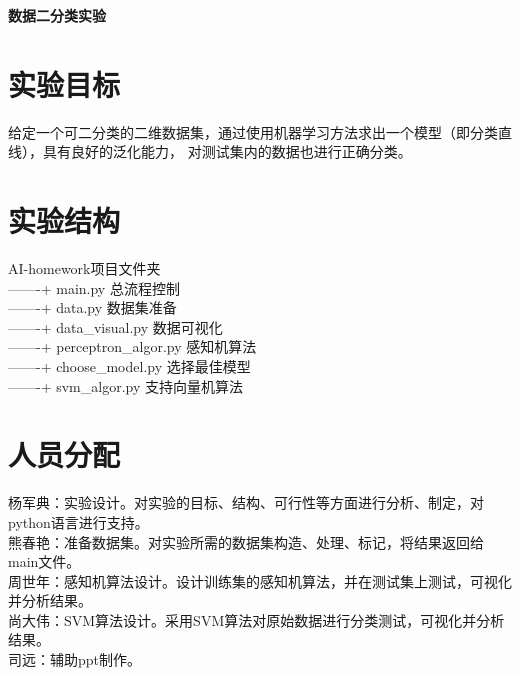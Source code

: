 \documentclass[UTF8,twoside,fontset=none,heading=true,scheme=chinese]{ctexart}
\newcommand{\erhao}{\fontsize{22pt}{33pt}\selectfont}
\newcommand{\wuhao}{\fontsize{10.5pt}{15.75pt}\selectfont}
\begin{document}
\wuhao

    \begin{center}
        \vspace{6pt}
        \erhao \textbf{
        数据二分类实验
        }
        \vspace{8pt}
    \end{center}

    \section{实验目标}
    \noindent 给定一个可二分类的二维数据集，通过使用机器学习方法求出一个模型（即分类直线），具有良好的泛化能力，
    对测试集内的数据也进行正确分类。

    \section{实验结构}
    \noindent AI-homework\quad 项目文件夹 \\    
    -------+ main.py  \qquad 总流程控制 \\
    -------+ data.py  \qquad 数据集准备 \\  
    -------+ data\_visual.py  \qquad 数据可视化 \\
    -------+ perceptron\_algor.py  \qquad 感知机算法 \\
    -------+ choose\_model.py  \qquad 选择最佳模型 \\
    -------+ svm\_algor.py  \qquad 支持向量机算法 \\

    \section{人员分配}
    \noindent 杨军典：实验设计。对实验的目标、结构、可行性等方面进行分析、制定，对python语言进行支持。\\
    熊春艳：准备数据集。对实验所需的数据集构造、处理、标记，将结果返回给main文件。\\
    周世年：感知机算法设计。设计训练集的感知机算法，并在测试集上测试，可视化并分析结果。\\
    尚大伟：SVM算法设计。采用SVM算法对原始数据进行分类测试，可视化并分析结果。 \\
    司远：辅助ppt制作。
\end{document}
